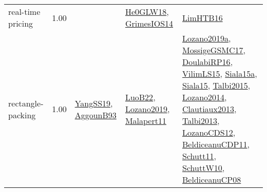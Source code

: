 {\begin{longtable}{p{3cm}r>{\raggedright\arraybackslash}p{6cm}>{\raggedright\arraybackslash}p{6cm}>{\raggedright\arraybackslash}p{8cm}}
\index{real-time pricing}\index{ApplicationAreas!real-time pricing}real-time pricing &  1.00 &  & \hyperref[detail:He0GLW18]{He0GLW18}, \hyperref[detail:GrimesIOS14]{GrimesIOS14} & \hyperref[detail:LimHTB16]{LimHTB16}\\
\index{rectangle-packing}\index{ApplicationAreas!rectangle-packing}rectangle-packing &  1.00 & \hyperref[detail:YangSS19]{YangSS19}, \hyperref[detail:AggounB93]{AggounB93} & \hyperref[detail:LuoB22]{LuoB22}, \hyperref[detail:Lozano2019]{Lozano2019}, \hyperref[detail:Malapert11]{Malapert11} & \hyperref[detail:Lozano2019a]{Lozano2019a}, \hyperref[detail:MossigeGSMC17]{MossigeGSMC17}, \hyperref[detail:DoulabiRP16]{DoulabiRP16}, \hyperref[detail:VilimLS15]{VilimLS15}, \hyperref[detail:Siala15a]{Siala15a}, \hyperref[detail:Siala15]{Siala15}, \hyperref[detail:Talbi2015]{Talbi2015}, \hyperref[detail:Lozano2014]{Lozano2014}, \hyperref[detail:Clautiaux2013]{Clautiaux2013}, \hyperref[detail:Talbi2013]{Talbi2013}, \hyperref[detail:LozanoCDS12]{LozanoCDS12}, \hyperref[detail:BeldiceanuCDP11]{BeldiceanuCDP11}, \hyperref[detail:Schutt11]{Schutt11}, \hyperref[detail:SchuttW10]{SchuttW10}, \hyperref[detail:BeldiceanuCP08]{BeldiceanuCP08}\\

\end{longtable}}
